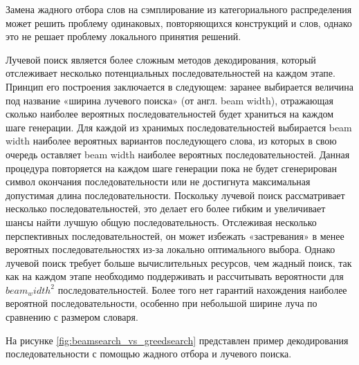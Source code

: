 \documentclass[a4paper,12pt]{extarticle}
\begin{document}
Замена жадного отбора слов на сэмплирование из категориального распределения может решить проблему одинаковых, повторяющихся конструкций и слов, однако это не решает проблему локального принятия решений.

Лучевой поиск является более сложным методов декодирования, который отслеживает несколько потенциальных последовательностей на каждом этапе. Принцип его построения заключается в следующем: заранее выбирается величина под название «ширина лучевого поиска» (от англ. beam width), отражающая сколько наиболее вероятных последовательностей будет храниться на каждом шаге генерации. Для каждой из хранимых последовательностей выбирается beam width наиболее вероятных вариантов последующего слова, из которых в свою очередь оставляет beam width наиболее вероятных последовательностей. Данная процедура повторяется на каждом шаге генерации пока не будет сгенерирован символ окончания последовательности или не достигнута максимальная допустимая длина последовательности. Поскольку лучевой поиск рассматривает несколько последовательностей, это делает его более гибким и увеличивает шансы найти лучшую общую последовательность. Отслеживая несколько перспективных последовательностей, он может избежать «застревания» в менее вероятных последовательностях из-за локально оптимального выбора. Однако лучевой поиск требует больше вычислительных ресурсов, чем жадный поиск, так как на каждом этапе необходимо поддерживать и рассчитывать вероятности для $beam_width^2$ последовательностей. Более того нет гарантий нахождения наиболее вероятной последовательности, особенно при небольшой ширине луча по сравнению с размером словаря.

На рисунке \ref{fig:beamsearch_vs_greedsearch} представлен пример декодирования последовательности с помощью жадного отбора и лучевого поиска.
\end{document}

